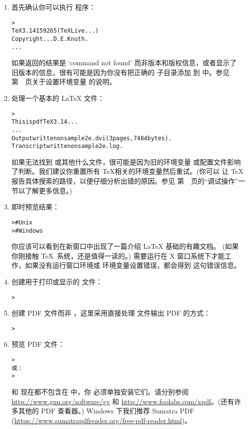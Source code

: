 \documentclass{article}
\begin{document}
\begin{enumerate}

\item 首先确认你可以执行  程序：
\begin{alltt}
> 
TeX 3.14159265 (TeX Live ...)
Copyright ... D.E. Knuth.
...
\end{alltt}
如果返回的结果是 `command not found' 而非版本和版权信息，或者显示了
旧版本的信息，很有可能是因为你没有把正确的  子目录添加
到  中。参见第~\pageref{sec:env}~页关于设置环境变量
的说明。

\item 处理一个基本的 \LaTeX{} 文件：
\begin{alltt}
> 
This is pdfTeX 3.14...
...
Output written on sample2e.dvi (3 pages, 7484 bytes).
Transcript written on sample2e.log.
\end{alltt}
如果无法找到  或其他什么文件，很可能是因为旧的环境变量
或配置文件影响了判断。我们建议你重置所有 \TeX 相关的环境变量然后重试。(你可以
让 \TeX{} 报告具体搜索的路径，以便仔细分析出错的原因。参见
第~\pageref{sec:debugging}~页的``调试操作''一节以了解更多信息。)

\item 即时预览结果：
\begin{alltt}
>     # Unix
>   # Windows
\end{alltt}
你应该可以看到在新窗口中出现了一篇介绍 \LaTeX{} 基础的有趣文档。
(如果你刚接触 \TeX\ 系统，还是值得一读的。) 
需要运行在 X 窗口系统下才能工作，如果没有运行窗口环境或
 环境变量设置错误，都会得到
 这句错误信息。

\item 创建用于打印或显示的 \PS{} 文件：
\begin{alltt}
> 
\end{alltt}

\item 创建 PDF 文件而非 \dvi{}，这里采用直接处理 
文件输出 PDF 的方式：
\begin{alltt}
> 
\end{alltt}

\item 预览 PDF 文件：
\begin{alltt}
> 
\textrm{或：}
> 
\end{alltt}
 和  现在都不包含在 \TL{} 中，你
必须单独安装它们。请分别参阅 \url{http://www.gnu.org/software/gv} 和
\url{http://www.foolabs.com/xpdf}。(还有许多其他的 PDF 查看器。)
Windows 下我们推荐 Sumatra PDF
(\url{https://www.sumatrapdfreader.org/free-pdf-reader.html})。


\end{enumerate}
\end{document}
